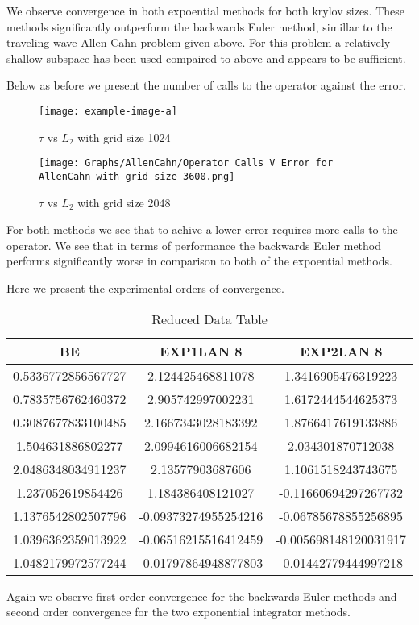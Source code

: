 We observe convergence in both expoential methods for both krylov sizes.
These methods significantly outperform the backwards Euler method, simillar to the traveling wave Allen Cahn problem given above.
For this problem a relatively shallow subspace has been used compaired to above and appears to be sufficient.

Below as before we present the number of calls to the operator against the error.
\begin{figure}[H]
    \centering
    \begin{minipage}{0.49\textwidth}
        \texttt{[image: example-image-a]} %
        \caption{$\tau$ vs $L_2$ with grid size 1024}
        \label{fig:plot1}
    \end{minipage}\hfill
    \centering
    \begin{minipage}{0.49\textwidth}
        \texttt{[image: Graphs/AllenCahn/Operator Calls V Error for AllenCahn with grid size 3600.png]} %
        \caption{$\tau$ vs $L_2$ with grid size 2048}
        \label{fig:plot2}
    \end{minipage}\hfill
\end{figure}
For both methods we see that to achive a lower error requires more calls to the operator.
We see that in terms of performance the backwards Euler method performs significantly worse in comparison to both of the expoential methods.

Here we present the experimental orders of convergence.

\begin{table}[H]
    \centering
    \begin{tabular}{| c | c | c |}
    \hline
    BE & EXP1LAN 8 & EXP2LAN 8 \\
    \hline
    0.5336772856567727 & 2.124425468811078    & 1.3416905476319223 \\
    0.7835756762460372 & 2.905742997002231    & 1.6172444544625373 \\
    0.3087677833100485 & 2.1667343028183392   & 1.8766417619133886 \\
    1.504631886802277  & 2.0994616006682154   & 2.034301870712038 \\
    2.0486348034911237 & 2.13577903687606     & 1.1061518243743675 \\
    1.237052619854426  & 1.184386408121027    & -0.11660694297267732 \\
    1.1376542802507796 & -0.09373274955254216 & -0.06785678855256895 \\
    1.0396362359013922 & -0.06516215516412459 & -0.005698148120031917 \\
    1.0482179972577244 & -0.01797864948877803 & -0.01442779444997218 \\
    \hline
    \end{tabular}
    \caption{Reduced Data Table}
    \label{tab:reduced_data}
\end{table}

Again we observe first order convergence for the backwards Euler methods and second order convergence for the two exponential integrator methods.

